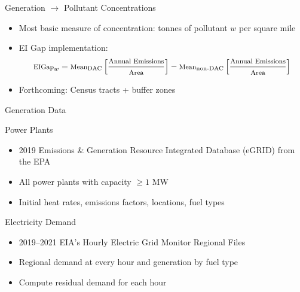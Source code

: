 \documentclass[11pt, aspectratio = 169]{beamer}
\newcommand{\1}{\mathds{1}}
\begin{document}
\begin{frame}{Generation $\to$ Pollutant Concentrations}

\begin{itemize}
    \item Most basic measure of concentration: tonnes of pollutant $w$ per square mile
    \vfill 
    \item EI Gap implementation:
    \begin{equation}\footnotesize
        \text{EIGap}_w = \text{Mean}_\text{DAC}\left[ \frac{\text{Annual Emissions}}{\text{Area}}\right] - \text{Mean}_\text{non-DAC}\left[ \frac{\text{Annual Emissions}}{\text{Area}}\right]
    \end{equation}
    \vfill

    \item Forthcoming: Census tracts + buffer zones
\end{itemize}

\end{frame}


\begin{frame}{Generation Data}
    
    Power Plants
    \begin{itemize}
        \item 2019 Emissions \& Generation Resource Integrated Database (eGRID) from the EPA
        \item All power plants with capacity $\geq 1$ MW
        \item Initial heat rates, emissions factors, locations, fuel types
    \end{itemize}

    \vfill
    Electricity Demand
    \begin{itemize}
        \item 2019--2021 EIA's Hourly Electric Grid Monitor Regional Files
        \item Regional demand at every hour and generation by fuel type
        \item Compute residual demand for each hour
    \end{itemize}

\end{frame}
\end{document}
